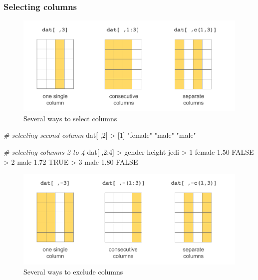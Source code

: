 \documentclass[
]{book}
\newenvironment{Shaded}{\begin{snugshade}}{\end{snugshade}}
\newcommand{\CommentTok}[1]{\textcolor[rgb]{0.56,0.35,0.01}{\textit{#1}}}
\newcommand{\ConstantTok}[1]{\textcolor[rgb]{0.00,0.00,0.00}{#1}}
\newcommand{\DecValTok}[1]{\textcolor[rgb]{0.00,0.00,0.81}{#1}}
\newcommand{\FloatTok}[1]{\textcolor[rgb]{0.00,0.00,0.81}{#1}}
\newcommand{\NormalTok}[1]{#1}
\newcommand{\SpecialCharTok}[1]{\textcolor[rgb]{0.00,0.00,0.00}{#1}}
\newcommand{\StringTok}[1]{\textcolor[rgb]{0.31,0.60,0.02}{#1}}
\begin{document}
\hypertarget{selecting-columns-1}{%
\subsubsection*{Selecting columns}\label{selecting-columns-1}}

\begin{figure}

{\centering \includegraphics[width=0.8\linewidth]{images/objects/obj-dataframe-cols1} 

}

\caption{Several ways to select columns}\label{fig:unnamed-chunk-180}
\end{figure}

\begin{Shaded}
\begin{Highlighting}[]
\CommentTok{\# selecting second column}
\NormalTok{dat[ ,}\DecValTok{2}\NormalTok{]}
\SpecialCharTok{\textgreater{}}\NormalTok{ [}\DecValTok{1}\NormalTok{] }\StringTok{"female"} \StringTok{"male"}   \StringTok{"male"}

\CommentTok{\# selecting columns 2 to 4}
\NormalTok{dat[ ,}\DecValTok{2}\SpecialCharTok{:}\DecValTok{4}\NormalTok{]}
\SpecialCharTok{\textgreater{}}\NormalTok{   gender height  jedi}
\SpecialCharTok{\textgreater{}} \DecValTok{1}\NormalTok{ female   }\FloatTok{1.50} \ConstantTok{FALSE}
\SpecialCharTok{\textgreater{}} \DecValTok{2}\NormalTok{   male   }\FloatTok{1.72}  \ConstantTok{TRUE}
\SpecialCharTok{\textgreater{}} \DecValTok{3}\NormalTok{   male   }\FloatTok{1.80} \ConstantTok{FALSE}
\end{Highlighting}
\end{Shaded}

\begin{figure}

{\centering \includegraphics[width=0.8\linewidth]{images/objects/obj-dataframe-cols2} 

}

\caption{Several ways to exclude columns}\label{fig:unnamed-chunk-182}
\end{figure}
\end{document}
